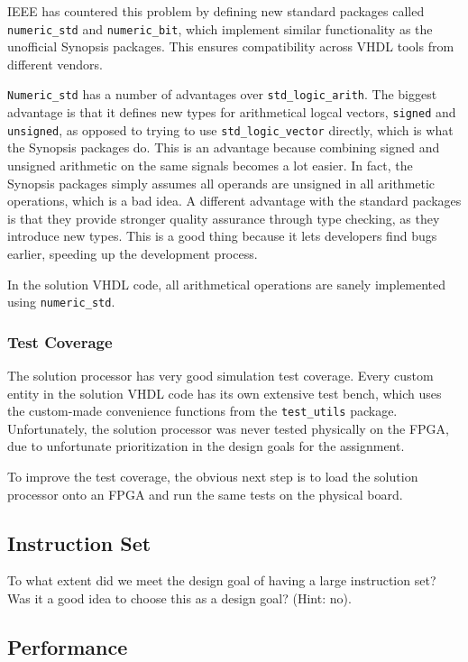 IEEE has countered this problem by defining new standard packages called \texttt{numeric\_std} and \texttt{numeric\_bit}, which implement similar functionality as the unofficial Synopsis packages.
This ensures compatibility across VHDL tools from different vendors.

\texttt{Numeric\_std} has a number of advantages over \texttt{std\_logic\_arith}.
The biggest advantage is that it defines new types for arithmetical logcal vectors, \texttt{signed} and \texttt{unsigned}, as opposed to trying to use \texttt{std\_logic\_vector} directly, which is what the Synopsis packages do.
This is an advantage because combining signed and unsigned arithmetic on the same signals becomes a lot easier.
In fact, the Synopsis packages simply assumes all operands are unsigned in all arithmetic operations, which is a bad idea.
A different advantage with the standard packages is that they provide stronger quality assurance through type checking, as they introduce new types.
This is a good thing because it lets developers find bugs earlier, speeding up the development process.

In the solution VHDL code, all arithmetical operations are sanely implemented using \texttt{numeric\_std}.

\subsubsection{Test Coverage}

The solution processor has very good simulation test coverage.
Every custom entity in the solution VHDL code has its own extensive test bench, which uses the custom-made convenience functions from the \texttt{test\_utils} package.
Unfortunately, the solution processor was never tested physically on the FPGA, due to unfortunate prioritization in the design goals for the assignment.

To improve the test coverage, the obvious next step is to load the solution processor onto an FPGA and run the same tests on the physical board.

\subsection{Instruction Set}

To what extent did we meet the design goal of having a large instruction set?
Was it a good idea to choose this as a design goal? (Hint: no).

\subsection{Performance}

